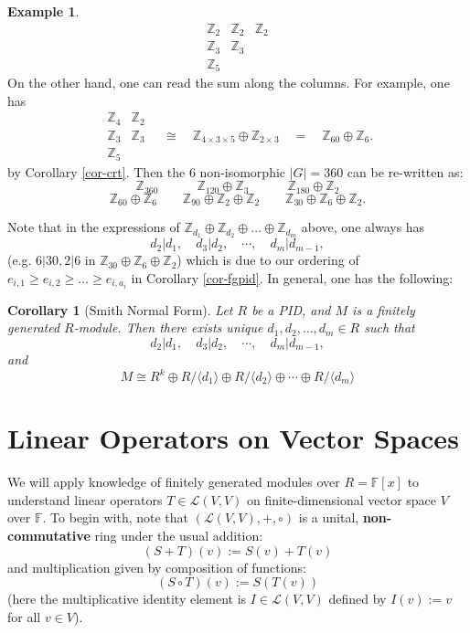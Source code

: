 \documentclass[11pt,openany]{book}
\theoremstyle{plain}
\newtheorem{corollary}[corollary]{Corollary}
\theoremstyle{definition}
\newtheorem{example}[example]{Example}
\theoremstyle{remark}
\begin{document}
\begin{example}
$$    \begin{matrix}
        \mathbb{Z}_2 & \mathbb{Z}_2 & \mathbb{Z}_2\\
        \mathbb{Z}_3 & \mathbb{Z}_3 \\
        \mathbb{Z}_5 &
    \end{matrix}$$
On the other hand, one can read the sum along the columns. For example, one has 
$$\begin{matrix}
        \mathbb{Z}_4 & \mathbb{Z}_2 \\
        \mathbb{Z}_3 & \mathbb{Z}_3 \\
        \mathbb{Z}_5
    \end{matrix} \quad \cong \quad \mathbb{Z}_{4 \times 3 \times 5} \oplus \mathbb{Z}_{2 \times 3} \quad = \quad \mathbb{Z}_{60} \oplus \mathbb{Z}_6.$$
by Corollary \ref{cor-crt}. Then the $6$ non-isomorphic $|G| = 360$ can be re-written as:
$$\mathbb{Z}_{360} \quad \quad \quad \mathbb{Z}_{120} \oplus \mathbb{Z}_3 \quad \quad \quad  \mathbb{Z}_{180} \oplus \mathbb{Z}_2$$
$$\mathbb{Z}_{60} \oplus \mathbb{Z}_6 \quad \quad \mathbb{Z}_{90} \oplus \mathbb{Z}_2 \oplus \mathbb{Z}_2 \quad \quad \mathbb{Z}_{30} \oplus \mathbb{Z}_6 \oplus \mathbb{Z}_2.$$
\end{example}

Note that in the expressions of $\mathbb{Z}_{d_1} \oplus \mathbb{Z}_{d_2} \oplus \dots \oplus \mathbb{Z}_{d_m}$ above, one always has
$$d_2| d_1, \quad d_3 | d_2, \quad \cdots, \quad d_m|d_{m-1},$$
(e.g. $6|30, 2|6$ in $\mathbb{Z}_{30} \oplus \mathbb{Z}_6 \oplus \mathbb{Z}_2$) which is due to our ordering of $e_{i,1} \geq e_{i,2} \geq \dots \geq e_{i,a_i}$ in Corollary \ref{cor-fgpid}. In general, one has the following:
\begin{corollary}[Smith Normal Form]
Let $R$ be a PID, and $M$ is a finitely generated $R$-module. Then there exists unique $d_1, d_2, \dots, d_m \in R$ such that
$$d_2| d_1, \quad d_3 | d_2, \quad \cdots, \quad d_m|d_{m-1},$$
and 
$$M \cong R^k \oplus R/\langle d_1 \rangle \oplus
R/\langle d_2 \rangle \oplus \cdots \oplus R/\langle d_m \rangle$$
\end{corollary}



\chapter{Linear Operators on Vector Spaces}
We will apply knowledge of finitely generated modules over $R 
= \mathbb{F}[x]$ to understand linear operators $T \in \mathcal{L}(V,V)$ on finite-dimensional vector space $V$ over $\mathbb{F}$. To begin with, note that $(\mathcal{L}(V,V), +, \circ)$ is a unital, {\bf non-commutative} ring under the usual addition:
$$(S + T)(v) := S(v) + T(v)$$
and multiplication given by composition of functions:
$$(S \circ T)(v) := S(T(v))$$
(here the multiplicative identity element is $I \in \mathcal{L}(V,V)$ defined by $I(v) := v$ for all $v \in V$). 
\end{document}
